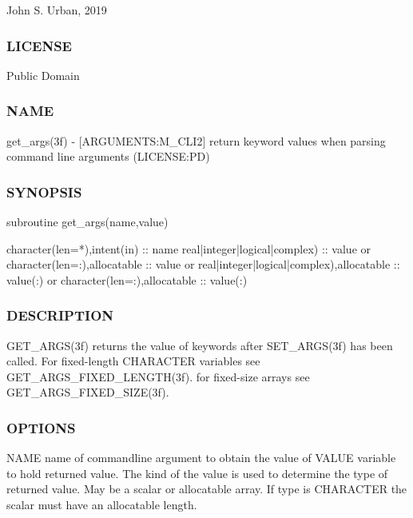 John S. Urban, 2019 \subsubsection*{L\+I\+C\+E\+N\+SE}

Public Domain \subsubsection*{N\+A\+ME}

get\+\_\+args(3f) -\/ \mbox{[}A\+R\+G\+U\+M\+E\+N\+TS\+:M\+\_\+\+C\+L\+I2\mbox{]} return keyword values when parsing command line arguments (L\+I\+C\+E\+N\+SE\+:PD)

\subsubsection*{S\+Y\+N\+O\+P\+S\+IS}

\begin{DoxyVerb} subroutine get_args(name,value)

  character(len=*),intent(in) :: name
  real|integer|logical|complex) :: value
     or
  character(len=:),allocatable :: value
     or
  real|integer|logical|complex),allocatable :: value(:)
     or
  character(len=:),allocatable :: value(:)
\end{DoxyVerb}


\subsubsection*{D\+E\+S\+C\+R\+I\+P\+T\+I\+ON}

\begin{DoxyVerb} GET_ARGS(3f) returns the value of keywords after SET_ARGS(3f)
 has been called. For fixed-length CHARACTER variables
 see GET_ARGS_FIXED_LENGTH(3f).  for fixed-size arrays see
 GET_ARGS_FIXED_SIZE(3f).
\end{DoxyVerb}


\subsubsection*{O\+P\+T\+I\+O\+NS}

\begin{DoxyVerb}  NAME       name of commandline argument to obtain the value of
  VALUE      variable to hold returned value. The kind of the value
             is used to determine the type of returned value. May
             be a scalar or allocatable array. If type is CHARACTER
             the scalar must have an allocatable length.
\end{DoxyVerb}


